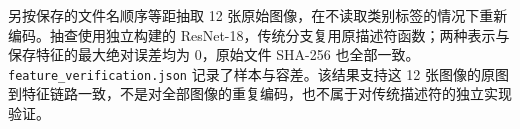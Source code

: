 另按保存的文件名顺序等距抽取 12 张原始图像，在不读取类别标签的情况下重新编码。抽查使用独立构建的 ResNet-18，传统分支复用原描述符函数；两种表示与保存特征的最大绝对误差均为 0，原始文件 SHA-256 也全部一致。\texttt{feature\_verification.json} 记录了样本与容差。该结果支持这 12 张图像的原图到特征链路一致，不是对全部图像的重复编码，也不属于对传统描述符的独立实现验证。
